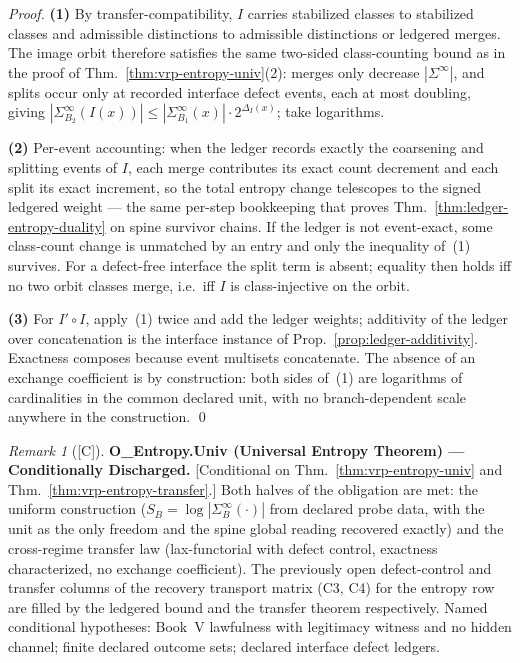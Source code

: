 \documentclass[12pt,oneside]{amsbook}
\theoremstyle{plain}
\theoremstyle{definition}
\theoremstyle{remark}
\newtheorem{remark}[theorem]{Remark}
\newcommand{\status}[1]{\textup{[#1]}}
\begin{document}
\begin{proof}
\textbf{(1)}  By transfer-compatibility, $I$ carries stabilized
classes to stabilized classes and admissible distinctions to
admissible distinctions or ledgered merges.  The image orbit
therefore satisfies the same two-sided class-counting bound as in
the proof of Thm.~\ref{thm:vrp-entropy-univ}(2): merges only
decrease $|\Sigma^\infty|$, and splits occur only at recorded
interface defect events, each at most doubling, giving
$|\Sigma_{B_2}^\infty(I(x))| \le |\Sigma_{B_1}^\infty(x)| \cdot
2^{\Delta_I(x)}$; take logarithms.

\textbf{(2)}  Per-event accounting: when the ledger records
exactly the coarsening and splitting events of $I$, each merge
contributes its exact count decrement and each split its exact
increment, so the total entropy change telescopes to the signed
ledgered weight --- the same per-step bookkeeping that proves
Thm.~\ref{thm:ledger-entropy-duality} on spine survivor chains.
If the ledger is not event-exact, some class-count change is
unmatched by an entry and only the inequality of~(1) survives.
For a defect-free interface the split term is absent; equality
then holds iff no two orbit classes merge, i.e.\ iff $I$ is
class-injective on the orbit.

\textbf{(3)}  For $I' \circ I$, apply~(1) twice and add the
ledger weights; additivity of the ledger over concatenation is
the interface instance of Prop.~\ref{prop:ledger-additivity}.
Exactness composes because event multisets concatenate.  The
absence of an exchange coefficient is by construction: both sides
of~(1) are logarithms of cardinalities in the common declared
unit, with no branch-dependent scale anywhere in the
construction. \qed
\end{proof}

\begin{remark}[\status{C}]\label{ob:vrp-entropy-univ}
\textbf{O\_Entropy.Univ (Universal Entropy Theorem) ---
Conditionally Discharged.}
\textup{[Conditional on Thm.~\ref{thm:vrp-entropy-univ} and
Thm.~\ref{thm:vrp-entropy-transfer}.]}
Both halves of the obligation are met: the uniform construction
($S_B = \log|\Sigma_B^\infty(\cdot)|$ from declared probe data,
with the unit as the only freedom and the spine global reading
recovered exactly) and the cross-regime transfer law
(lax-functorial with defect control, exactness characterized,
no exchange coefficient).  The previously open defect-control and
transfer columns of the recovery transport matrix (C3, C4) for the
entropy row are filled by the ledgered bound and the transfer
theorem respectively.  Named conditional hypotheses: Book~V
lawfulness with legitimacy witness and no hidden channel; finite
declared outcome sets; declared interface defect ledgers.
\end{remark}
\end{document}
